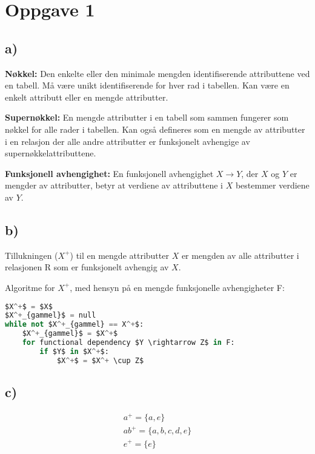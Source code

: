 \documentclass[a4paper, 12pt] {article}
\begin{document}

\newpage

\tableofcontents
\newpage


\section{Oppgave 1}

\subsection{a)}

\textbf{Nøkkel:} Den enkelte eller den minimale mengden identifiserende attributtene ved en tabell. Må være unikt identifiserende for hver rad i tabellen. Kan være en enkelt attributt eller en mengde attributter.


\textbf{Supernøkkel:} En mengde attributter i en tabell som sammen fungerer som nøkkel for alle rader i tabellen. Kan også defineres som en mengde av attributter i en relasjon der alle andre attributter er funksjonelt avhengige av supernøkkelattributtene.


\textbf{Funksjonell avhengighet:} En funksjonell avhengighet $X \rightarrow Y$, der $X$ og $Y$ er mengder av attributter, betyr at verdiene av attributtene i $X$ bestemmer verdiene av $Y$.

\subsection{b)}

Tillukningen ($X^+$) til en mengde attributter $X$ er mengden av alle attributter i relasjonen R som er funksjonelt avhengig av $X$.

Algoritme for $X^+$, med hensyn på en mengde funksjonelle avhengigheter F:

\begin{lstlisting}[language=Python, caption=Tillukningsalgoritme, mathescape]
$X^+$ = $X$
$X^+_{gammel}$ = null
while not $X^+_{gammel} == X^+$:
    $X^+_{gammel}$ = $X^+$
    for functional dependency $Y \rightarrow Z$ in F:
        if $Y$ in $X^+$:
            $X^+$ = $X^+ \cup Z$
\end{lstlisting}

\subsection{c)}

\begin{gather*}
a^+ = \{a, e\} \\
ab^+ = \{a, b, c, d, e\} \\
e^+ = \{e\}
\end{gather*}
\end{document}
